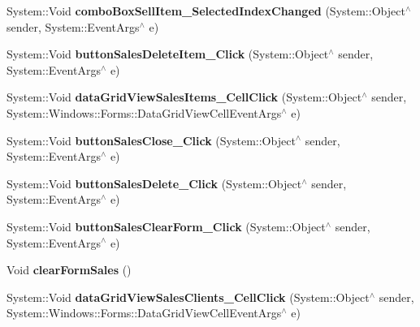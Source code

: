 \begin{DoxyCompactItemize}
System\+::\+Void {\bfseries combo\+Box\+Sell\+Item\+\_\+\+Selected\+Index\+Changed} (System\+::\+Object$^\wedge$ sender, System\+::\+Event\+Args$^\wedge$ e)
\item 
\hypertarget{class_magazyn_1_1_magazin_a19664754d090eaf27da1b466bcf0fb43}{}\label{class_magazyn_1_1_magazin_a19664754d090eaf27da1b466bcf0fb43} 
System\+::\+Void {\bfseries button\+Sales\+Delete\+Item\+\_\+\+Click} (System\+::\+Object$^\wedge$ sender, System\+::\+Event\+Args$^\wedge$ e)
\item 
\hypertarget{class_magazyn_1_1_magazin_a0f1b3f4da16de2da70c5b5cca1ad4eb9}{}\label{class_magazyn_1_1_magazin_a0f1b3f4da16de2da70c5b5cca1ad4eb9} 
System\+::\+Void {\bfseries data\+Grid\+View\+Sales\+Items\+\_\+\+Cell\+Click} (System\+::\+Object$^\wedge$ sender, System\+::\+Windows\+::\+Forms\+::\+Data\+Grid\+View\+Cell\+Event\+Args$^\wedge$ e)
\item 
\hypertarget{class_magazyn_1_1_magazin_a0160af3b98739778c1e2e1312d31d994}{}\label{class_magazyn_1_1_magazin_a0160af3b98739778c1e2e1312d31d994} 
System\+::\+Void {\bfseries button\+Sales\+Close\+\_\+\+Click} (System\+::\+Object$^\wedge$ sender, System\+::\+Event\+Args$^\wedge$ e)
\item 
\hypertarget{class_magazyn_1_1_magazin_a96f1e7d9daf88de45ec2a76e2df19b10}{}\label{class_magazyn_1_1_magazin_a96f1e7d9daf88de45ec2a76e2df19b10} 
System\+::\+Void {\bfseries button\+Sales\+Delete\+\_\+\+Click} (System\+::\+Object$^\wedge$ sender, System\+::\+Event\+Args$^\wedge$ e)
\item 
\hypertarget{class_magazyn_1_1_magazin_a6d6d6e6a61a4880994aad40e206e0364}{}\label{class_magazyn_1_1_magazin_a6d6d6e6a61a4880994aad40e206e0364} 
System\+::\+Void {\bfseries button\+Sales\+Clear\+Form\+\_\+\+Click} (System\+::\+Object$^\wedge$ sender, System\+::\+Event\+Args$^\wedge$ e)
\item 
\hypertarget{class_magazyn_1_1_magazin_ade058b3ee5433620fad999b81f71af39}{}\label{class_magazyn_1_1_magazin_ade058b3ee5433620fad999b81f71af39} 
Void {\bfseries clear\+Form\+Sales} ()
\item 
\hypertarget{class_magazyn_1_1_magazin_aef618ab780d3b4ad6b44bf93140cf878}{}\label{class_magazyn_1_1_magazin_aef618ab780d3b4ad6b44bf93140cf878} 
System\+::\+Void {\bfseries data\+Grid\+View\+Sales\+Clients\+\_\+\+Cell\+Click} (System\+::\+Object$^\wedge$ sender, System\+::\+Windows\+::\+Forms\+::\+Data\+Grid\+View\+Cell\+Event\+Args$^\wedge$ e)
\item 
\hypertarget{class_magazyn_1_1_magazin_a09b94963cdf1a63ff1f922b798a205f9}{}\label{class_magazyn_1_1_magazin_a09b94963cdf1a63ff1f922b798a205f9} 

\end{DoxyCompactItemize}

